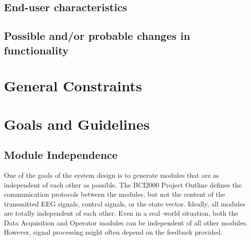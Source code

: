 \subsection{End-user characteristics}

\subsection{Possible and/or probable changes in functionality}

     
\section{General Constraints}


     
 
\section{Goals and Guidelines}
\label{des_consid_goals}

\subsection{Module Independence}
\label{goals_module_independence}

One of the goals of the system design is to generate modules that are as 
independent of each other as possible. The BCI2000 Project Outline defines the 
communication protocols between the modules, but not the content of the 
transmitted EEG signals, control signals, or the state vector. Ideally, all 
modules are totally independent of each other. Even in a real--world situation, 
both the Data Acquisition and Operator modules can be independent of all other 
modules. However, signal processing might often depend on the feedback provided. 

